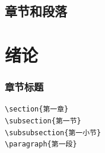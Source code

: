 \subsection{章节和段落}
\section{绪论}

\subsubsection{章节标题}
\begin{verbatim}    
\section{第一章}
\subsection{第一节}
\subsubsection{第一小节}
\paragraph{第一段}
\end{verbatim}
